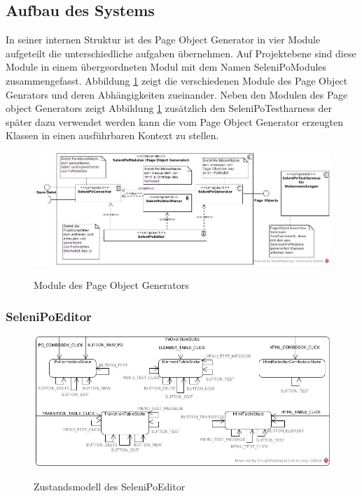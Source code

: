 \subsection{Aufbau des Systems}
In seiner internen Struktur ist des Page Object Generator in vier Module aufgeteilt die unterschiedliche aufgaben übernehmen. Auf Projektebene sind diese Module in einem übergeordneten Modul mit dem Namen SeleniPoModules zusammengefasst. Abbildung \ref{fig:component_diagramm} zeigt die verschiedenen Module des Page Object Genrators und deren Abhängigkeiten zueinander.
Neben den Modulen des Page object Generators zeigt Abbildung \ref{fig:component_diagramm} zusätzlich den SeleniPoTestharness der später dazu verwendet werden kann die vom Page Object Generator erzeugten Klassen in einen ausführbaren Kontext zu stellen.

\begin{figure}[htb]
  \centering  
  \includegraphics[scale=0.46]{img/ComponentDiagram.jpg}\\
  \caption{Module des Page Object Generators}
  \label{fig:component_diagramm}
\end{figure}

\subsubsection{SeleniPoEditor}


\begin{figure}[htb]
  \centering  
  \includegraphics[scale=0.46]{img/StateMashine.jpg}\\
  \caption{Zustandsmodell des SeleniPoEditor}
  \label{fig:state_mashine}
\end{figure}

